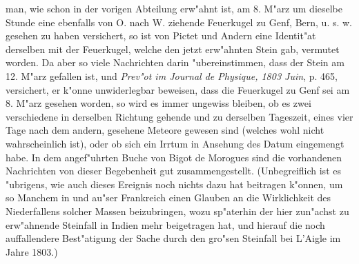 \documentclass[a4paper, 11pt, oneside, polutonikogreek, german]{article}
\begin{document}
man, wie schon in der vorigen Abteilung erw"ahnt ist, am 8. M"arz um dieselbe Stunde eine ebenfalls von O. nach W. ziehende Feuerkugel zu Genf, Bern, u. s. w. gesehen zu haben versichert, so ist von Pictet und Andern eine Identit"at derselben mit der Feuerkugel, welche den jetzt erw"ahnten Stein gab, vermutet worden. Da aber so viele Nachrichten darin "ubereinstimmen, dass der Stein am 12. M"arz gefallen ist, und \emph{Prev"ot im Journal de Physique, 1803 Juin}, p. 465, versichert, er k"onne unwiderlegbar beweisen, dass die Feuerkugel zu Genf sei am 8. M"arz gesehen worden, so wird es immer ungewiss bleiben, ob es zwei verschiedene in derselben Richtung gehende und zu derselben Tageszeit, eines vier Tage nach dem andern, gesehene Meteore gewesen sind (welches wohl nicht wahrscheinlich ist), oder ob sich ein Irrtum in Ansehung des Datum eingemengt habe. In dem angef"uhrten Buche von Bigot de Morogues sind die vorhandenen Nachrichten von dieser Begebenheit gut zusammengestellt. (Unbegreiflich ist es "ubrigens, wie auch dieses Ereignis noch nichts dazu hat beitragen k"onnen, um so Manchem in und au"ser Frankreich einen Glauben an die Wirklichkeit des Niederfallens solcher Massen beizubringen, wozu sp"aterhin der hier zun"achst zu erw"ahnende Steinfall in Indien mehr beigetragen hat, und hierauf die noch auffallendere Best"atigung der Sache durch den gro"sen Steinfall bei L'Aigle im Jahre 1803.)
\end{document}
